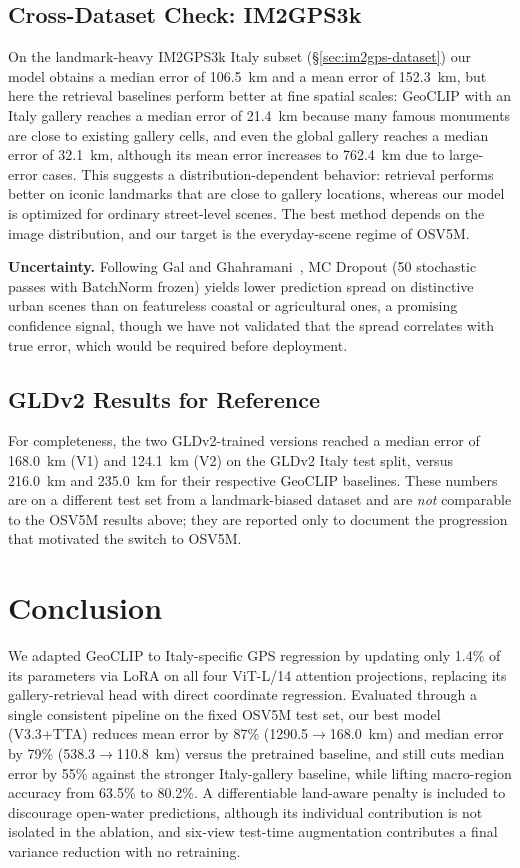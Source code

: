 \documentclass[10pt,twocolumn,letterpaper]{article}
\begin{document}
\subsection{Cross-Dataset Check: IM2GPS3k}
\label{sec:im2gps}

On the landmark-heavy IM2GPS3k Italy subset (\S\ref{sec:im2gps-dataset}) our
model obtains a median error of 106.5~km and a mean error of 152.3~km, but here
the retrieval
baselines perform better at fine spatial scales: GeoCLIP with an Italy gallery
reaches a median error of 21.4~km because many famous monuments are close to
existing gallery cells, and even the global gallery reaches a median error of
32.1~km, although its mean error increases to 762.4~km due to large-error cases.
This suggests a distribution-dependent behavior: retrieval performs better on
iconic landmarks that are close to gallery locations, whereas our model is
optimized for ordinary street-level scenes. The best method depends on the
image distribution, and our target is the everyday-scene regime of OSV5M.

\noindent\textbf{Uncertainty.} Following Gal and Ghahramani~\cite{mcdropout}, MC
Dropout (50 stochastic passes with BatchNorm frozen) yields lower prediction
spread on distinctive urban scenes than on featureless coastal or agricultural
ones, a promising confidence signal, though we have not validated that the
spread correlates with true error, which would be required before deployment.

\subsection{GLDv2 Results for Reference}
\label{sec:gldv2}

For completeness, the two GLDv2-trained versions reached a median error of
168.0~km (V1) and 124.1~km (V2) on the GLDv2 Italy test split, versus 216.0~km
and 235.0~km for their respective GeoCLIP baselines. These numbers are on a
different test set from a landmark-biased dataset and are \emph{not} comparable
to the OSV5M results above; they are reported only to document the progression
that motivated the switch to OSV5M.

\section{Conclusion}

We adapted GeoCLIP to Italy-specific GPS regression by updating only 1.4\% of its
parameters via LoRA on all four ViT-L/14 attention projections, replacing its
gallery-retrieval head with direct coordinate regression.
Evaluated through a single consistent pipeline on the fixed OSV5M test set, our
best model (V3.3+TTA) reduces mean error by 87\% (1290.5$\to$168.0~km) and median
error by 79\% (538.3$\to$110.8~km) versus the pretrained baseline, and still cuts
median error by 55\% against the stronger Italy-gallery baseline, while lifting
macro-region accuracy from 63.5\% to 80.2\%.
A differentiable land-aware penalty is included to discourage open-water
predictions, although its individual contribution is not isolated in the
ablation, and six-view test-time augmentation contributes a final variance
reduction with no retraining.
\end{document}

